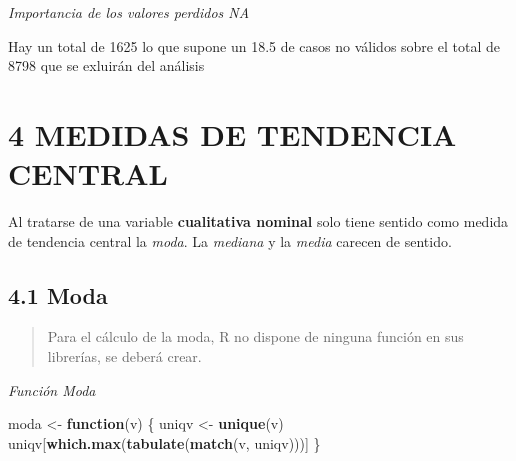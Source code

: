 \documentclass[
]{article}
\newenvironment{Shaded}{\begin{snugshade}}{\end{snugshade}}
\newcommand{\ControlFlowTok}[1]{\textcolor[rgb]{0.13,0.29,0.53}{\textbf{#1}}}
\newcommand{\DecValTok}[1]{\textcolor[rgb]{0.00,0.00,0.81}{#1}}
\newcommand{\FunctionTok}[1]{\textcolor[rgb]{0.13,0.29,0.53}{\textbf{#1}}}
\newcommand{\NormalTok}[1]{#1}
\newcommand{\OtherTok}[1]{\textcolor[rgb]{0.56,0.35,0.01}{#1}}
\newcommand{\SpecialCharTok}[1]{\textcolor[rgb]{0.81,0.36,0.00}{\textbf{#1}}}
\begin{document}
\begin{Shaded}
\end{Shaded}

\emph{Importancia de los valores perdidos NA}

Hay un total de 1625 lo que supone un 18.5 de casos no válidos sobre el
total de 8798 que se exluirán del análisis

\newpage

\hypertarget{medidas-de-tendencia-central}{%
\section{4 MEDIDAS DE TENDENCIA
CENTRAL}\label{medidas-de-tendencia-central}}

Al tratarse de una variable \textbf{cualitativa nominal} solo tiene
sentido como medida de tendencia central la \emph{moda}. La
\emph{mediana} y la \emph{media} carecen de sentido.

\hypertarget{moda}{%
\subsection{4.1 Moda}\label{moda}}

\begin{quote}
Para el cálculo de la moda, R no dispone de ninguna función en sus
librerías, se deberá crear.
\end{quote}

\emph{Función Moda}

\begin{Shaded}
\begin{Highlighting}[]
\NormalTok{moda }\OtherTok{\textless{}{-}} \ControlFlowTok{function}\NormalTok{(v) \{}
\NormalTok{  uniqv }\OtherTok{\textless{}{-}} \FunctionTok{unique}\NormalTok{(v)}
\NormalTok{  uniqv[}\FunctionTok{which.max}\NormalTok{(}\FunctionTok{tabulate}\NormalTok{(}\FunctionTok{match}\NormalTok{(v, uniqv)))]}
\NormalTok{\}}
\end{Highlighting}
\end{Shaded}
\end{document}
